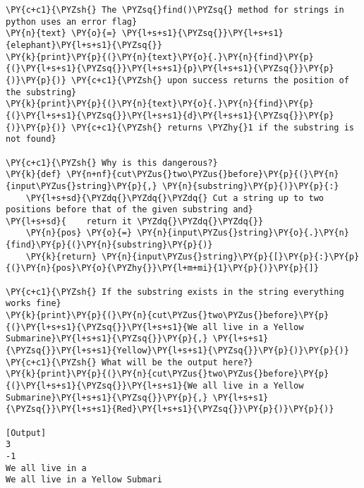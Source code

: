 \begin{Verbatim}[label=\makebox{\url{https://github.com/lucabaldini/cmepda/tree/master/slides/latex/snippets/error\_flags.py}},commandchars=\\\{\}]
\PY{c+c1}{\PYZsh{} The \PYZsq{}find()\PYZsq{} method for strings in python uses an error flag}
\PY{n}{text} \PY{o}{=} \PY{l+s+s1}{\PYZsq{}}\PY{l+s+s1}{elephant}\PY{l+s+s1}{\PYZsq{}}
\PY{k}{print}\PY{p}{(}\PY{n}{text}\PY{o}{.}\PY{n}{find}\PY{p}{(}\PY{l+s+s1}{\PYZsq{}}\PY{l+s+s1}{p}\PY{l+s+s1}{\PYZsq{}}\PY{p}{)}\PY{p}{)} \PY{c+c1}{\PYZsh{} upon success returns the position of the substring}
\PY{k}{print}\PY{p}{(}\PY{n}{text}\PY{o}{.}\PY{n}{find}\PY{p}{(}\PY{l+s+s1}{\PYZsq{}}\PY{l+s+s1}{d}\PY{l+s+s1}{\PYZsq{}}\PY{p}{)}\PY{p}{)} \PY{c+c1}{\PYZsh{} returns \PYZhy{}1 if the substring is not found}

\PY{c+c1}{\PYZsh{} Why is this dangerous?}
\PY{k}{def} \PY{n+nf}{cut\PYZus{}two\PYZus{}before}\PY{p}{(}\PY{n}{input\PYZus{}string}\PY{p}{,} \PY{n}{substring}\PY{p}{)}\PY{p}{:}
    \PY{l+s+sd}{\PYZdq{}\PYZdq{}\PYZdq{} Cut a string up to two positions before that of the given substring and}
\PY{l+s+sd}{    return it \PYZdq{}\PYZdq{}\PYZdq{}}
    \PY{n}{pos} \PY{o}{=} \PY{n}{input\PYZus{}string}\PY{o}{.}\PY{n}{find}\PY{p}{(}\PY{n}{substring}\PY{p}{)}
    \PY{k}{return} \PY{n}{input\PYZus{}string}\PY{p}{[}\PY{p}{:}\PY{p}{(}\PY{n}{pos}\PY{o}{\PYZhy{}}\PY{l+m+mi}{1}\PY{p}{)}\PY{p}{]}

\PY{c+c1}{\PYZsh{} If the substring exists in the string everything works fine}
\PY{k}{print}\PY{p}{(}\PY{n}{cut\PYZus{}two\PYZus{}before}\PY{p}{(}\PY{l+s+s1}{\PYZsq{}}\PY{l+s+s1}{We all live in a Yellow Submarine}\PY{l+s+s1}{\PYZsq{}}\PY{p}{,} \PY{l+s+s1}{\PYZsq{}}\PY{l+s+s1}{Yellow}\PY{l+s+s1}{\PYZsq{}}\PY{p}{)}\PY{p}{)}
\PY{c+c1}{\PYZsh{} What will be the output here?}
\PY{k}{print}\PY{p}{(}\PY{n}{cut\PYZus{}two\PYZus{}before}\PY{p}{(}\PY{l+s+s1}{\PYZsq{}}\PY{l+s+s1}{We all live in a Yellow Submarine}\PY{l+s+s1}{\PYZsq{}}\PY{p}{,} \PY{l+s+s1}{\PYZsq{}}\PY{l+s+s1}{Red}\PY{l+s+s1}{\PYZsq{}}\PY{p}{)}\PY{p}{)}

[Output]
3
-1
We all live in a
We all live in a Yellow Submari
\end{Verbatim}